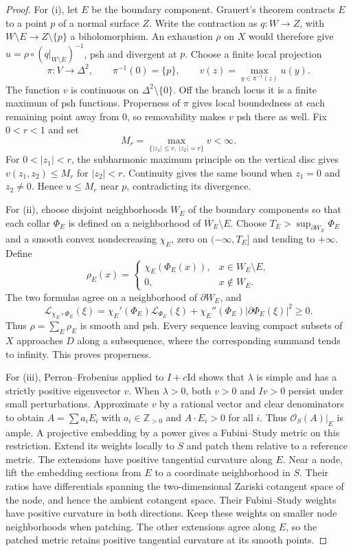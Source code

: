 \documentclass[11pt]{amsart}
\theoremstyle{definition}
\theoremstyle{remark}
\numberwithin{equation}{section}
\newcommand{\OO}{\mathcal O}
\newcommand{\Levi}{\mathcal L}
\begin{document}
\begin{proof}
For \textup{(i)}, let $E$ be the boundary component. Grauert's theorem
\cite[\S4, subsection~8(e)]{Grauert1962} contracts $E$ to
a point $p$ of a normal surface $Z$. Write the contraction as
$q:W\to Z$, with $W\setminus E\to Z\setminus\{p\}$ a biholomorphism.
An exhaustion $\rho$ on $X$ would therefore give
$u=\rho\circ(q|_{W\setminus E})^{-1}$, psh and divergent at $p$.
Choose a finite local projection
\[
 \pi:V\longrightarrow\Delta^2,\qquad \pi^{-1}(0)=\{p\},
 \qquad v(z)=\max_{y\in\pi^{-1}(z)}u(y).
\]
The function $v$ is continuous on $\Delta^2\setminus\{0\}$.
Off the branch locus it is a finite maximum of psh functions.
Properness of $\pi$ gives local boundedness at each remaining point
away from $0$, so removability makes $v$ psh there as well.
Fix $0<r<1$ and set
\[
 M_r=\max_{\{|z_1|\le r,\ |z_2|=r\}}v<\infty.
\]
For $0<|z_1|<r$, the subharmonic maximum principle on the vertical
disc gives $v(z_1,z_2)\le M_r$ for $|z_2|<r$. Continuity gives the
same bound when $z_1=0$ and $z_2\ne0$. Hence $u\le M_r$ near $p$,
contradicting its divergence.

For \textup{(ii)}, choose disjoint neighborhoods $W_E$ of the
boundary components so that each collar $\Phi_E$ is defined on a
neighborhood of $\overline W_E\setminus E$.
Choose $T_E>\sup_{\partial W_E}\Phi_E$ and a smooth convex
nondecreasing $\chi_E$, zero on $(-\infty,T_E]$ and tending to
$+\infty$. Define
\[
 \rho_E(x)=
 \begin{cases}\chi_E(\Phi_E(x)),&x\in W_E\setminus E,\\
 0,&x\notin W_E.
 \end{cases}
\]
The two formulas agree on a neighborhood of $\partial W_E$, and
\[
 \Levi_{\chi_E\circ\Phi_E}(\xi)
 =\chi_E'(\Phi_E)\Levi_{\Phi_E}(\xi)
  +\chi_E''(\Phi_E)|\partial\Phi_E(\xi)|^2\ge0.
\]
Thus $\rho=\sum_E\rho_E$ is smooth and psh. Every sequence leaving
compact subsets of $X$ approaches $D$ along a subsequence, where the
corresponding summand tends to infinity. This proves properness.

For \textup{(iii)}, Perron--Frobenius applied to $I+c\mathrm{Id}$
shows that $\lambda$ is simple and has a strictly positive
eigenvector $v$. When $\lambda>0$, both $v>0$ and $Iv>0$ persist
under small perturbations. Approximate $v$ by a rational vector and
clear denominators to obtain
$A=\sum a_iE_i$ with $a_i\in\mathbb Z_{>0}$ and
$A\cdot E_i>0$ for all $i$.
Thus $\OO_S(A)|_E$ is ample. A projective embedding by a power
gives a Fubini--Study metric on this restriction. Extend its weights
locally to $S$ and patch them relative to a reference metric.
The extensions have positive tangential curvature along $E$.
Near a node, lift the embedding sections from $E$ to a coordinate
neighborhood in $S$. Their ratios have differentials spanning the
two-dimensional Zariski cotangent space of the node, and hence the
ambient cotangent space. Their Fubini--Study weights have positive
curvature in both directions. Keep these weights on smaller node
neighborhoods when patching. The other extensions agree along $E$,
so the patched metric retains positive tangential curvature at its
smooth points.


\end{proof}
\end{document}
